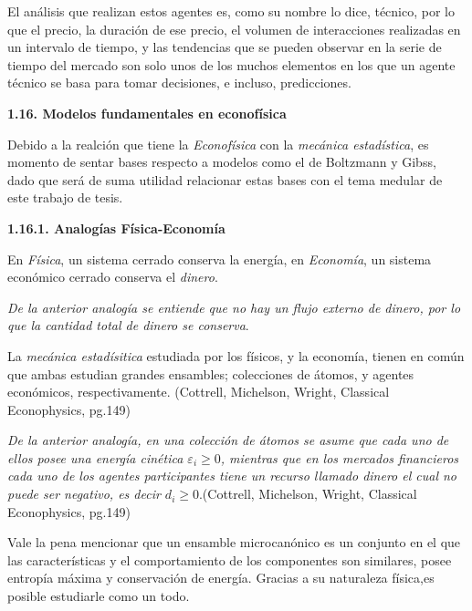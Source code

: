 El análisis que realizan estos agentes es, como su nombre lo dice, técnico, por lo que el precio, la duración de ese precio, el volumen de interacciones realizadas en un intervalo de tiempo, y las tendencias que se pueden observar en la serie de tiempo del mercado son solo unos de los muchos elementos en los que un agente técnico se basa para tomar decisiones, e incluso, predicciones.
\newline

{
\noindent
\Large  \textbf{1.16. Modelos fundamentales en econofísica} 
}

Debido a la realción que tiene la \textit{Econofísica} con la \textit{mecánica estadística}, es momento de sentar bases respecto a modelos como el de Boltzmann y Gibss, dado que será de suma utilidad relacionar estas bases con el tema medular de este trabajo de tesis.
\newline
\vspace{0.5cm}

{
\noindent
\Large  \textbf{1.16.1. Analogías Física-Economía} 
}

En \textit{Física}, un sistema cerrado conserva la energía,  en \textit{Economía}, un sistema económico cerrado conserva el \textit{dinero}. \newline

\textit{De la anterior analogía se entiende que no hay un flujo externo de dinero, por lo que la cantidad total de dinero se conserva}.

La \textit{mecánica estadísitica} estudiada por los físicos, y la economía, tienen en común que ambas estudian grandes ensambles; colecciones de átomos, y agentes económicos, respectivamente.
(Cottrell, Michelson, Wright, Classical Econophysics, pg.149)

\textit{De la anterior analogía, en una colección de átomos se asume que cada uno de ellos posee una energía cinética $\mathit{\varepsilon}_{i} \geqslant 0 $, mientras que en los mercados financieros cada uno de los agentes participantes tiene un recurso llamado dinero el cual no puede ser negativo, es decir  $\mathit{d}_{i} \geqslant 0 $}.(Cottrell, Michelson, Wright, Classical Econophysics, pg.149)

Vale la pena mencionar que un ensamble microcanónico es un conjunto  en el que las características y el comportamiento de los componentes son similares, posee entropía máxima y conservación de energía. Gracias a su naturaleza física,es posible estudiarle como un todo.  
\vspace{0.5cm}

